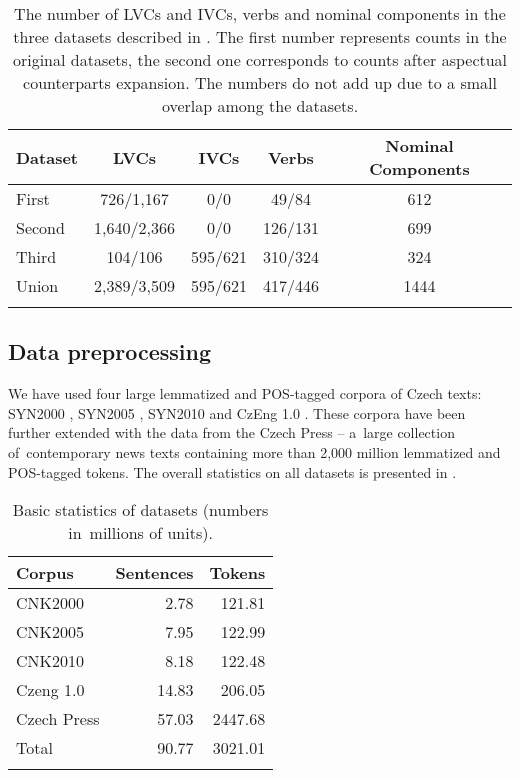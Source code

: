 \documentclass[output=paper
,modfonts
,nonflat]{langsci/langscibook}
\begin{document}
\begin{table}[tb]
	\centering
	\begin{tabular}{lcccc}
	 \lsptoprule
     Dataset  & LVCs        & IVCs    & Verbs   & Nominal Components \\ \midrule
     First    & 726/1,167   & 0/0     & 49/84   & 612   \\ \hline
     Second   & 1,640/2,366 & 0/0     & 126/131 & 699   \\ \hline
     Third    & 104/106     & 595/621 & 310/324 & 324   \\ \hline
     Union    & 2,389/3,509 & 595/621 & 417/446 & 1444  \\ 
	\lspbottomrule  
	\end{tabular} 
	\caption{The number of LVCs and IVCs, verbs and nominal components in the 
	three datasets described in . The first number represents 
	counts in the original datasets, the second one corresponds to counts after 
	aspectual counterparts expansion. The numbers do not add up due to a small 
	overlap among the datasets.}
	\label{statistics}
\end{table}


\subsection{Data preprocessing} 
\label{sec:preprocess}
We have used four large lemmatized and POS-tagged corpora of Czech texts: 
SYN2000 \citep{SYN2000}, SYN2005 \citep{SYN2005}, SYN2010 \citep{SYN2010} and 
CzEng 1.0 \citep{czeng10}. These corpora have been further extended with the 
data from the Czech Press -- a~large collection of~contemporary news texts 
containing more than 2,000 million lemmatized and POS-tagged tokens. The 
overall statistics on all datasets is presented in .

\begin{table}[tb]
\centering
\begin{tabular}{lrr}
\lsptoprule
Corpus & Sentences & Tokens \\ 
\midrule
CNK2000 & 2.78 & 121.81 \\
CNK2005 & 7.95 & 122.99 \\
CNK2010 & 8.18 & 122.48 \\
Czeng 1.0 & 14.83 & 206.05 \\
Czech Press & 57.03 & 2447.68 \\ \hline
Total & 90.77 & 3021.01 \\
\lspbottomrule
\end{tabular}
\caption{Basic statistics of datasets (numbers in~millions of units).}
\label{data}
\end{table}
\end{document}
